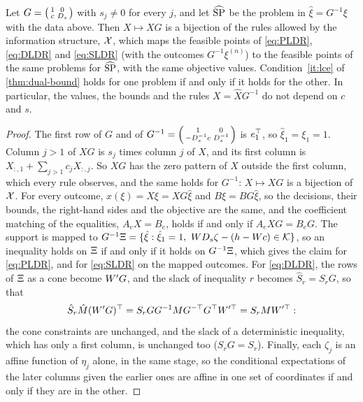 \begin{proposition}
\label{prop:affine-invariance}
Let $G = \begin{psmallmatrix} 1 & 0 \\ c & D_s \end{psmallmatrix}$ with $s_j \ne 0$ for every $j$,
and let $\widehat{\textup{SP}}$ be the problem in $\hat\xi = G^{-1}\xi$ with the data above.
Then $X \mapsto XG$ is a bijection of the rules allowed by the information structure, $\mathcal{X}$,
which maps the feasible points of \eqref{eq:PLDR}, \eqref{eq:DLDR} and \eqref{eq:SLDR} (with the outcomes $G^{-1}\xi^{(n)}$) to the feasible points of the same problems for $\widehat{\textup{SP}}$, with the same objective values.
Condition~\ref{it:lce} of \cref{thm:dual-bound} holds for one problem if and only if it holds for the other.
In particular, the values, the bounds and the rules $X = \hat XG^{-1}$ do not depend on $c$ and $s$.
\end{proposition}

\begin{proof}
The first row of $G$ and of $G^{-1} = \begin{psmallmatrix} 1 & 0 \\ -D_s^{-1}c & D_s^{-1} \end{psmallmatrix}$ is $e_1^\top$, so $\hat\xi_1 = \xi_1 = 1$.
Column $j > 1$ of $XG$ is $s_j$ times column $j$ of $X$, and its first column is $X_{:,1} + \sum_{j > 1} c_jX_{:,j}$.
So $XG$ has the zero pattern of $X$ outside the first column, which every rule observes, and the same holds for $G^{-1}$:
$X \mapsto XG$ is a bijection of $\mathcal{X}$.
For every outcome, $x(\xi) = X\xi = XG\hat\xi$ and $B\xi = BG\hat\xi$,
so the decisions, their bounds, the right-hand sides and the objective are the same,
and the coefficient matching of the equalities, $A_eX = B_e$, holds if and only if $A_eXG = B_eG$.
The support is mapped to $G^{-1}\Xi = \{\hat\xi : \hat\xi_1 = 1,\ WD_s\zeta - (h - Wc) \in \mathcal{K}\}$,
so an inequality holds on $\Xi$ if and only if it holds on $G^{-1}\Xi$,
which gives the claim for \eqref{eq:PLDR}, and for \eqref{eq:SLDR} on the mapped outcomes.
For \eqref{eq:DLDR}, the rows of $\Xi$ as a cone become $W' G$, and the slack of inequality $r$ becomes $\hat S_r = S_rG$, so that
\[
\hat S_r \hat{M} (W' G)^\top = S_r G G^{-1}M G^{-\top} G^\top W'^\top = S_rMW'^\top:
\]
the cone constraints are unchanged, and the slack of a deterministic inequality, which has only a first column, is unchanged too ($S_rG = S_r$).
Finally, each $\zeta_j$ is an affine function of $\eta_j$ alone, in the same stage,
so the conditional expectations of the later columns given the earlier ones are affine in one set of coordinates if and only if they are in the other.
\end{proof}

